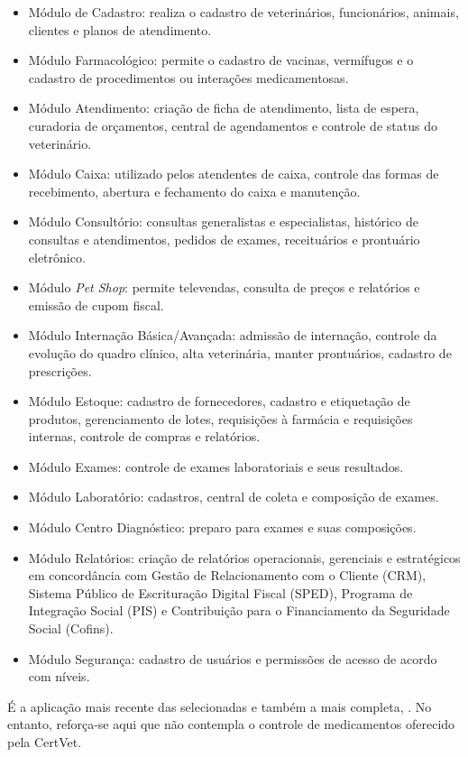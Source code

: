 \documentclass[
    12pt,               %
    openright,          %
    oneside,
    a4paper,            %
    BIBLATEX,           %
    TODO,               %
    english,            %
    brazil              %
    ]{ifsp-spo-inf-ctds}
\begin{document}
\begin{itemize}
    \item Módulo de Cadastro: realiza o cadastro de veterinários, funcionários, animais, clientes e planos de atendimento.
    \item Módulo Farmacológico: permite o cadastro de vacinas, vermífugos e o cadastro de procedimentos ou interações medicamentosas.
    \item Módulo Atendimento: criação de ficha de atendimento, lista de espera, curadoria de orçamentos, central de   agendamentos e controle de status do veterinário.
    \item Módulo Caixa: utilizado pelos atendentes de caixa, controle das formas de recebimento, abertura e fechamento do caixa e manutenção.
    \item Módulo Consultório: consultas generalistas e especialistas, histórico de consultas e atendimentos, pedidos de exames, receituários e prontuário eletrônico.
    \item Módulo \emph{Pet Shop}: permite televendas, consulta de preços e relatórios e emissão de cupom fiscal.
    \item Módulo Internação Básica/Avançada: admissão de internação, controle da evolução do quadro clínico, alta veterinária, manter prontuários, cadastro de prescrições.
    \item Módulo Estoque: cadastro de fornecedores, cadastro e etiquetação de produtos, gerenciamento de lotes, requisições à farmácia e requisições internas, controle de compras e relatórios.
    \item Módulo Exames: controle de exames laboratoriais e seus resultados.
    \item Módulo Laboratório: cadastros, central de coleta e composição de exames.
    \item Módulo Centro Diagnóstico: preparo para exames e suas composições.
    \item Módulo Relatórios: criação de relatórios operacionais, gerenciais e estratégicos em concordância com Gestão de Relacionamento com o Cliente (CRM), Sistema Público de Escrituração Digital Fiscal (SPED), Programa de Integração Social (PIS) e Contribuição para o Financiamento da Seguridade Social (Cofins).
    \item Módulo Segurança: cadastro de usuários e permissões de acesso de acordo com níveis.
\end{itemize}

    É a aplicação mais recente das selecionadas e também a mais completa, . No entanto, reforça-se aqui que não contempla o controle de medicamentos oferecido pela CertVet.
\end{document}
